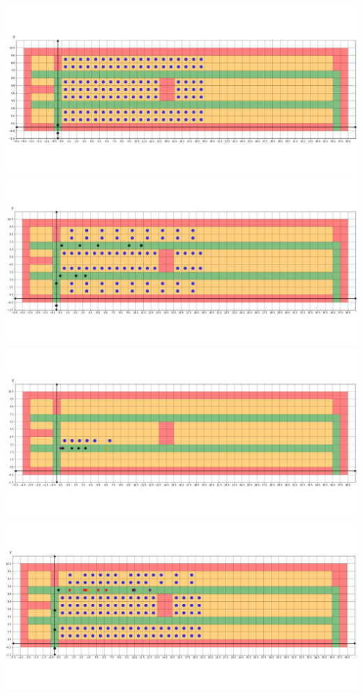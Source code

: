 \documentclass{article}
\theoremstyle{definition}
\theoremstyle{remark}
\numberwithin{equation}{section}
\begin{document}
	\begin{center}
		\includegraphics[width=14cm]{two1.jpg}\\
		\thispagestyle{empty}
		\includegraphics[width=14cm]{two2.jpg}\\
		\includegraphics[width=14cm]{two3.jpg}\\
		\includegraphics[width=14cm]{twobtf1.jpg}\\

\end{center}
\end{document}
